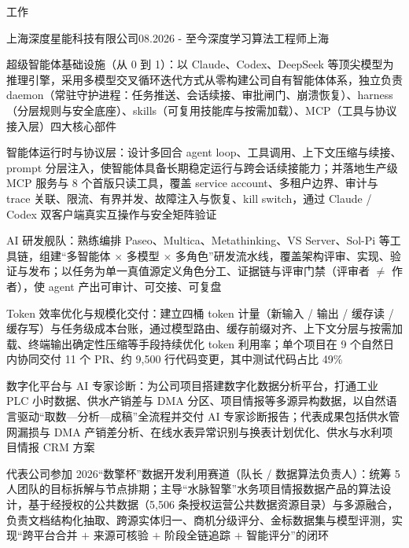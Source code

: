 \documentclass{resume} %
\begin{document}
\begin{rSection}{工作}

  \begin{rSubsection}{上海深度星能科技有限公司}{08.2026 - 至今}{深度学习算法工程师}{上海}
    \item 超级智能体基础设施（从 0 到 1）：以 Claude、Codex、DeepSeek 等顶尖模型为推理引擎，采用多模型交叉循环迭代方式从零构建公司自有智能体体系，独立负责 daemon（常驻守护进程：任务推送、会话续接、审批闸门、崩溃恢复）、harness（分层规则与安全底座）、skills（可复用技能库与按需加载）、MCP（工具与协议接入层）四大核心部件
    \item 智能体运行时与协议层：设计多回合 agent loop、工具调用、上下文压缩与续接、prompt 分层注入，使智能体具备长期稳定运行与跨会话续接能力；并落地生产级 MCP 服务与 8 个首版只读工具，覆盖 service account、多租户边界、审计与 trace 关联、限流、有界并发、故障注入与恢复、kill switch，通过 Claude / Codex 双客户端真实互操作与安全矩阵验证
    \item AI 研发舰队：熟练编排 Paseo、Multica、Metathinking、VS Server、Sol-Pi 等工具链，组建“多智能体 $\times$ 多模型 $\times$ 多角色”研发流水线，覆盖架构评审、实现、验证与发布；以任务为单一真值源定义角色分工、证据链与评审门禁（评审者 $\neq$ 作者），使 agent 产出可审计、可交接、可复盘
    \item Token 效率优化与规模化交付：建立四桶 token 计量（新输入 / 输出 / 缓存读 / 缓存写）与任务级成本台账，通过模型路由、缓存前缀对齐、上下文分层与按需加载、终端输出确定性压缩等手段持续优化 token 利用率；单个项目在 9 个自然日内协同交付 11 个 PR、约 9,500 行代码变更，其中测试代码占比 49\%
    \item 数字化平台与 AI 专家诊断：为公司项目搭建数字化数据分析平台，打通工业 PLC 小时数据、供水产销差与 DMA 分区、项目情报等多源异构数据，以自然语言驱动“取数—分析—成稿”全流程并交付 AI 专家诊断报告；代表成果包括供水管网漏损与 DMA 产销差分析、在线水表异常识别与换表计划优化、供水与水利项目情报 CRM 方案
    \item 代表公司参加 2026“数擎杯”数据开发利用赛道（队长 / 数据算法负责人）：统筹 5 人团队的目标拆解与节点排期；主导“水脉智擎”水务项目情报数据产品的算法设计，基于经授权的公共数据（5,506 条授权运营公共数据资源目录）与多源融合，负责文档结构化抽取、跨源实体归一、商机分级评分、金标数据集与模型评测，实现“跨平台合并 $+$ 来源可核验 $+$ 阶段全链追踪 $+$ 智能评分”的闭环
  \end{rSubsection}


\end{rSection}
\end{document}
